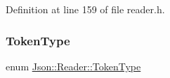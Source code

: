 Definition at line 159 of file reader.\+h.

\hypertarget{class_json_1_1_reader_aa35e6ab574dc399a0a645ad98ed66bc9}{}\label{class_json_1_1_reader_aa35e6ab574dc399a0a645ad98ed66bc9} 
\subsubsection{\texorpdfstring{Token\+Type}{TokenType}\hspace{0.1cm}{\footnotesize\ttfamily [2/2]}}
{\footnotesize\ttfamily enum \hyperlink{class_json_1_1_reader_aa35e6ab574dc399a0a645ad98ed66bc9}{Json\+::\+Reader\+::\+Token\+Type}\hspace{0.3cm}{\ttfamily [private]}}

